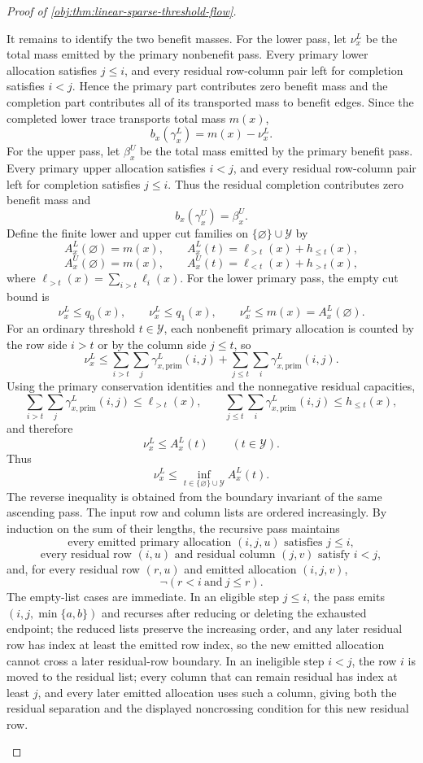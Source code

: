 \begin{proof}[Proof of \cref{obj:thm:linear-sparse-threshold-flow}]
\begin{enumerate}
It remains to identify the two benefit masses.  For the lower pass, let \(\nu_x^L\) be the total mass emitted by the primary nonbenefit pass.  Every primary lower allocation satisfies \(j\le i\), and every residual row-column pair left for completion satisfies \(i<j\).  Hence the primary part contributes zero benefit mass and the completion part contributes all of its transported mass to benefit edges.  Since the completed lower trace transports total mass \(m(x)\),
\[
b_x(\gamma_x^L)=m(x)-\nu_x^L.
\]
For the upper pass, let \(\beta_x^U\) be the total mass emitted by the primary benefit pass.  Every primary upper allocation satisfies \(i<j\), and every residual row-column pair left for completion satisfies \(j\le i\).  Thus the residual completion contributes zero benefit mass and
\[
b_x(\gamma_x^U)=\beta_x^U.
\]
Define the finite lower and upper cut families on \(\{\varnothing\}\cup\mathcal Y\) by
\[
A_x^L(\varnothing)=m(x),
\qquad
A_x^L(t)=\ell_{>t}(x)+h_{\le t}(x),
\]
\[
A_x^U(\varnothing)=m(x),
\qquad
A_x^U(t)=\ell_{<t}(x)+h_{>t}(x),
\]
where \(\ell_{>t}(x)=\sum_{i>t}\ell_i(x)\).  For the lower primary pass, the empty cut bound is
\[
\nu_x^L\le q_0(x),
\qquad
\nu_x^L\le q_1(x),
\qquad
\nu_x^L\le m(x)=A_x^L(\varnothing).
\]
For an ordinary threshold \(t\in\mathcal Y\), each nonbenefit primary allocation is counted by the row side \(i>t\) or by the column side \(j\le t\), so
\[
\nu_x^L
\le
\sum_{i>t}\sum_j\gamma_{x,\mathrm{prim}}^L(i,j)
+
\sum_{j\le t}\sum_i\gamma_{x,\mathrm{prim}}^L(i,j).
\]
Using the primary conservation identities and the nonnegative residual capacities,
\[
\sum_{i>t}\sum_j\gamma_{x,\mathrm{prim}}^L(i,j)
\le \ell_{>t}(x),
\qquad
\sum_{j\le t}\sum_i\gamma_{x,\mathrm{prim}}^L(i,j)
\le h_{\le t}(x),
\]
and therefore
\[
\nu_x^L\le A_x^L(t)
\qquad(t\in\mathcal Y).
\]
Thus
\[
\nu_x^L\le \inf_{t\in\{\varnothing\}\cup\mathcal Y}A_x^L(t).
\]
The reverse inequality is obtained from the boundary invariant of the same ascending pass.  The input row and column lists are ordered increasingly.  By induction on the sum of their lengths, the recursive pass maintains
\[
\text{every emitted primary allocation }(i,j,u)\text{ satisfies }j\le i,
\]
\[
\text{every residual row }(i,u)\text{ and residual column }(j,v)\text{ satisfy }i<j,
\]
and, for every residual row \((r,u)\) and emitted allocation \((i,j,v)\),
\[
\neg(r<i\ \text{and}\ j\le r).
\]
The empty-list cases are immediate.  In an eligible step \(j\le i\), the pass emits \((i,j,\min\{a,b\})\) and recurses after reducing or deleting the exhausted endpoint; the reduced lists preserve the increasing order, and any later residual row has index at least the emitted row index, so the new emitted allocation cannot cross a later residual-row boundary.  In an ineligible step \(i<j\), the row \(i\) is moved to the residual list; every column that can remain residual has index at least \(j\), and every later emitted allocation uses such a column, giving both the residual separation and the displayed noncrossing condition for this new residual row.


\end{enumerate}
\end{proof}
